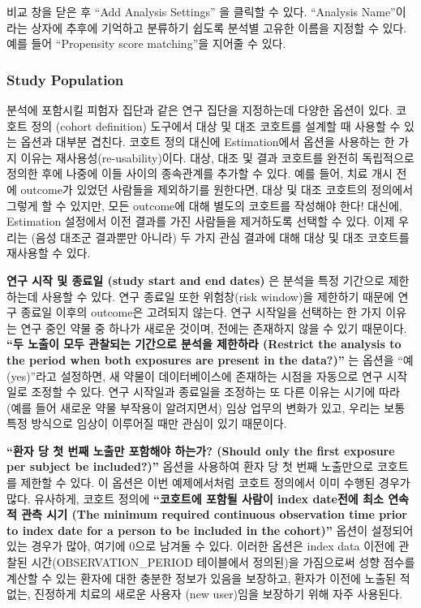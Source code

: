 \documentclass[11pt]{book}
\theoremstyle{definition}
\theoremstyle{definition}
\theoremstyle{definition}
\theoremstyle{remark}
\begin{document}
비교 창을 닫은 후 ``Add Analysis Settings'' 을 클릭할 수 있다.
``Analysis Name''이라는 상자에 추후에 기억하고 분류하기 쉽도록 분석별
고유한 이름을 지정할 수 있다. 예를 들어 ``Propensity score matching''을
지어줄 수 있다.

\subsubsection*{Study Population}\label{study-population}

분석에 포함시킬 피험자 집단과 같은 연구 집단을 지정하는데 다양한 옵션이
있다. 코호트 정의 (cohort definition) 도구에서 대상 및 대조 코호트를
설계할 때 사용할 수 있는 옵션과 대부분 겹친다. 코호트 정의 대신에
Estimation에서 옵션을 사용하는 한 가지 이유는
재사용성(re-usability)이다. 대상, 대조 및 결과 코호트를 완전히
독립적으로 정의한 후에 나중에 이들 사이의 종속관계를 추가할 수 있다.
예를 들어, 치료 개시 전에 outcome가 있었던 사람들을 제외하기를 원한다면,
대상 및 대조 코호트의 정의에서 그렇게 할 수 있지만, 모든 outcome에 대해
별도의 코호트를 작성해야 한다! 대신에, Estimation 설정에서 이전 결과를
가진 사람들을 제거하도록 선택할 수 있다. 이제 우리는 (음성 대조군
결과뿐만 아니라) 두 가지 관심 결과에 대해 대상 및 대조 코호트를 재사용할
수 있다.

\textbf{연구 시작 및 종료일 (study start and end dates)} 은 분석을 특정
기간으로 제한하는데 사용할 수 있다. 연구 종료일 또한 위험창(risk
window)을 제한하기 때문에 연구 종료일 이후의 outcome은 고려되지 않는다.
연구 시작일을 선택하는 한 가지 이유는 연구 중인 약물 중 하나가 새로운
것이며, 전에는 존재하지 않을 수 있기 때문이다. \textbf{``두 노출이 모두
관찰되는 기간으로 분석을 제한하라 (Restrict the analysis to the period
when both exposures are present in the data?)''} 는 옵션을
``예(yes)''라고 설정하면, 새 약물이 데이터베이스에 존재하는 시점을
자동으로 연구 시작일로 조정할 수 있다. 연구 시작일과 종료일을 조정하는
또 다른 이유는 시기에 따라 (예를 들어 새로운 약물 부작용이 알려지면서)
임상 업무의 변화가 있고, 우리는 보통 특정 방식으로 임상이 이루어질 때만
관심이 있기 때문이다.

\textbf{``환자 당 첫 번째 노출만 포함해야 하는가? (Should only the first
exposure per subject be included?)''} 옵션을 사용하여 환자 당 첫 번째
노출만으로 코호트를 제한할 수 있다. 이 옵션은 이번 예제에서처럼 코호트
정의에서 이미 수행된 경우가 많다. 유사하게, 코호트 정의에
\textbf{``코호트에 포함될 사람이 index date전에 최소 연속적 관측 시기
(The minimum required continuous observation time prior to index date
for a person to be included in the cohort)''} 옵션이 설정되어 있는
경우가 많아, 여기에 0으로 남겨둘 수 있다. 이러한 옵션은 index data
이전에 관찰된 시간(OBSERVATION\_PERIOD 테이블에서 정의된)을 가짐으로써
성향 점수를 계산할 수 있는 환자에 대한 충분한 정보가 있음을 보장하고,
환자가 이전에 노출된 적 없는, 진정하게 치료의 새로운 사용자 (new
user)임을 보장하기 위해 자주 사용된다.
\end{document}
